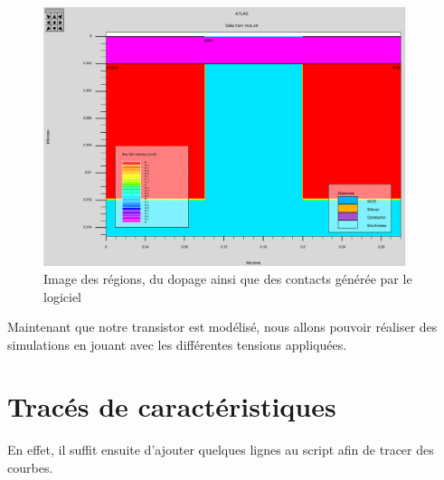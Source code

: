 \documentclass[a4paper,11pt]{report}
\begin{document}
\begin{figure}
    \centering
    \includegraphics[width=300pt]{TransistorFull.png}
    \caption{Image des régions, du dopage ainsi que des contacts générée par le logiciel}
    \label{TransistorFull}
\end{figure}

Maintenant que notre transistor est modélisé, nous allons pouvoir réaliser des simulations en jouant avec les différentes tensions appliquées.

\section{Tracés de caractéristiques}

En effet, il suffit ensuite d'ajouter quelques lignes au script afin de tracer des courbes.
\end{document}
